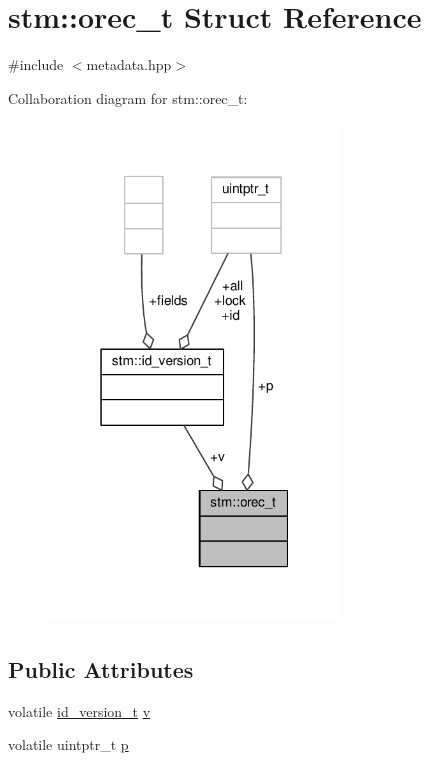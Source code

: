 \hypertarget{structstm_1_1orec__t}{\section{stm\-:\-:orec\-\_\-t Struct Reference}
\label{structstm_1_1orec__t}
}


{\ttfamily \#include $<$metadata.\-hpp$>$}



Collaboration diagram for stm\-:\-:orec\-\_\-t\-:
\nopagebreak
\begin{figure}[H]
\begin{center}
\leavevmode
\includegraphics[width=220pt]{structstm_1_1orec__t__coll__graph}
\end{center}
\end{figure}
\subsection*{Public Attributes}
\begin{DoxyCompactItemize}
\item 
volatile \hyperlink{unionstm_1_1id__version__t}{id\-\_\-version\-\_\-t} \hyperlink{structstm_1_1orec__t_a51e0b43d140f014b61f0d7445603b499}{v}
\item 
volatile uintptr\-\_\-t \hyperlink{structstm_1_1orec__t_a78fd1223b5c4b0d1ec0ae06da1ff2453}{p}
\end{DoxyCompactItemize}


